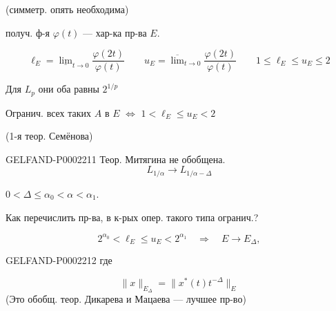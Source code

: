 (симметр. опять необходима)



получ. ф-я $\varphi(t)$ — хар-ка пр-ва $E$.



\begin{equation*}
 \ell_E=\underline{\lim}_{t\to0}\frac{\varphi(2t)}{\varphi(t)}
 \qquad
 u_E=\overline{\lim}_{t\to0}\frac{\varphi(2t)}{\varphi(t)}
 \qquad 1\leq\ell_E\leq u_E\leq2
\end{equation*}





Для $L_p$ они оба равны $2^{1/p}$

Огранич. всех таких $A$ в $E$ $\Longleftrightarrow$ $1<\ell_E\leq u_E<2$

(1-я теор. Семёнова)



\begin{GelfandAdjacentEvidence}{GELFAND-P000221}{1}
Теор. Митягина не обобщена.
\begin{equation*}
 L_{1/\alpha}\longrightarrow L_{1/\alpha-\Delta}
\end{equation*}
\end{GelfandAdjacentEvidence}

$0<\Delta\leq\alpha_0<\alpha<\alpha_1$.



Как перечислить пр-ва, в к-рых опер. такого типа огранич.?



\begin{equation*}
 2^{\alpha_0}<\ell_E\leq u_E<2^{\alpha_1}\quad\Longrightarrow\quad E\longrightarrow E_\Delta,
\end{equation*}



\begin{GelfandAdjacentEvidence}{GELFAND-P000221}{2}
где 
\end{GelfandAdjacentEvidence}

\begin{equation*}
 \|x\|_{E_\Delta}=\|x^*(t)t^{-\Delta}\|_E
\end{equation*}
(Это обобщ. теор. Дикарева и Мацаева — лучшее пр-во)



